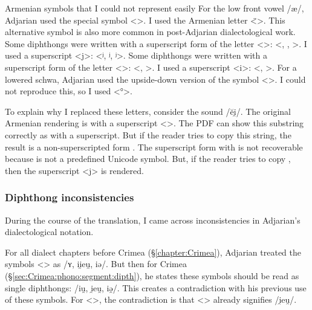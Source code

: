 \documentclass[output=paper]{langscibook}
\begin{document}
\newpage
\ea  Armenian symbols that I could not represent easily 
	\ea For the low front vowel /æ/, Adjarian used the special symbol 
	<>. I used the  Armenian letter <̈>. This alternative symbol is also more common in post-Adjarian dialectological work. 
	\ex Some diphthongs were written with a superscript form of the letter <>: <\textsuperscript{}, \textsuperscript{},   \textsuperscript{}>. I used a superscript <j>: 	<ʲ, ʲ, ʲ>. 
	\ex Some diphthongs were written with a superscript form of the letter <>: <\textsuperscript{}, \textsuperscript{}>. I used a superscript <i>: 	<, >. 
	\ex For a lowered schwa, Adjarian used the  upside-down version of the symbol <>. I could not reproduce this, so I used  <°>. 
	\z
\z
 
To explain why I replaced these letters, consider the sound /ĕi̯/. The original Armenian rendering is \textsuperscript{} with a superscript <>. The PDF can show this substring correctly as \textsuperscript{}  with a superscript.  But if the reader tries to copy this string, the result is a non-superscripted form  . The superscript form with \textsuperscript{} is not recoverable because \textsuperscript{}  is not a predefined Unicode symbol. But, if the reader tries to copy 		, then the superscript <j> is rendered. 


\subsubsection{Diphthong inconsistencies}\label{sec:HossepIntro:phonotransc:adjerror}

During the course of the translation, I came across inconsistencies in Adjarian's dialectological notation. 

For all dialect chapters before Crimea (\S\ref{chapter:Crimea}), Adjarian  treated the symbols <> as  /ʏ, ii̯eu̯, iə/. But then for Crimea (\S\ref{sec:Crimea:phono:segment:dipth}), he states these symbols should be read as single diphthongs: /iu̯, i̯eu̯,  iə̯/. This creates a contradiction with his previous use of these symbols. For <>, the contradiction is that <> already signifies /i̯eu̯/. 
\end{document}
